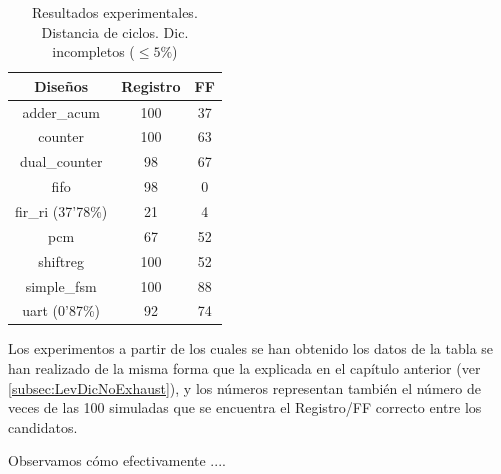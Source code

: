 \begin{table}[htbp]
    \ttabbox
    {\caption{Resultados experimentales. Distancia de ciclos. Dic.
    incompletos ($\leq5\%$)}
    \label{tab:LevenRes}}
    {
        \begin{tabular}{c|c c}
            \hline
            \rule[-8pt]{0pt}{22pt}{\bfseries{Diseños}}&{\bfseries{Registro}}
            &{\bfseries{\gls{FF}}} \\
            \hline
            \rule{0pt}{14pt}adder\_acum & 100 & 37\\
            counter & 100 & 63\\
            dual\_counter & 98 & 67\\
            fifo & 98 & 0\\
            fir\_ri (37'78\%) & 21 & 4\\
            pcm & 67 & 52\\
            shiftreg & 100 & 52\\
            simple\_fsm & 100 & 88\\
            uart (0'87\%) & 92 & 74\\
            \hline
        \end{tabular}
    }
\end{table}

Los experimentos a partir de los cuales se han obtenido los datos de la tabla se
han realizado de la misma forma que la explicada en el capítulo anterior
(ver \ref{subsec:LevDicNoExhaust}), y los números representan también el número de
veces de las 100 simuladas que se encuentra el Registro/FF correcto entre los
candidatos.

Observamos cómo efectivamente ....

\endinput
